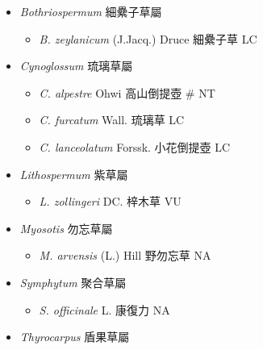 
  \begin{itemize}
 \item[] \textit{Bothriospermum} 細纍子草屬
                                
  \begin{itemize}
        \item[] \textit{B. zeylanicum} (J.Jacq.) Druce  細纍子草   LC
  \end{itemize}
 \item[] \textit{Cynoglossum} 琉璃草屬
                                
  \begin{itemize}
        \item[] \textit{C. alpestre} Ohwi  高山倒提壺  \# NT
        \item[] \textit{C. furcatum} Wall.  琉璃草   LC
        \item[] \textit{C. lanceolatum} Forssk.  小花倒提壺   LC
  \end{itemize}
 \item[] \textit{Lithospermum} 紫草屬
                                
  \begin{itemize}
        \item[] \textit{L. zollingeri} DC.  梓木草   VU
  \end{itemize}
 \item[] \textit{Myosotis} 勿忘草屬
                                
  \begin{itemize}
        \item[] \textit{M. arvensis} (L.) Hill  野勿忘草   NA
  \end{itemize}
 \item[] \textit{Symphytum} 聚合草屬
                                
  \begin{itemize}
        \item[] \textit{S. officinale} L.  康復力   NA
  \end{itemize}
 \item[] \textit{Thyrocarpus} 盾果草屬
                                

\end{itemize}
